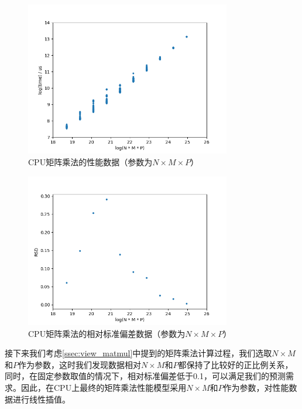     \begin{figure}[!htbp]
        \centering
        \includegraphics[width=0.8\textwidth]{figures/matmul_cpu_nmp.png}
        \caption{CPU矩阵乘法的性能数据（参数为$N \times M \times P $）}
        \label{fig:matmul_cpu_nmp}
    \end{figure}
    
    \begin{figure}[!htbp]
        \centering
        \includegraphics[width=0.8\textwidth]{figures/matmul_cpu_nmp_rsd.png}
        \caption{CPU矩阵乘法的相对标准偏差数据（参数为$ N \times M \times P $）}
        \label{fig:matmul_cpu_nmp_rsd}
    \end{figure}
    
    接下来我们考虑\ref{ssec:view_matmul}中提到的矩阵乘法计算过程，我们选取$ N \times M $和$ P $作为参数，这时我们发现数据相对$ N \times M $和$ P $都保持了比较好的正比例关系，同时，在固定参数取值的情况下，相对标准偏差低于0.1，可以满足我们的预测需求。因此，在CPU上最终的矩阵乘法性能模型采用$ N \times M $和$ P $作为参数，对性能数据进行线性插值。
    
